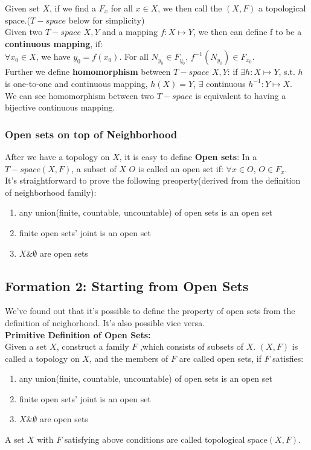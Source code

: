 \documentclass[a4paper, 12pt]{article}
\begin{document}
\newpage

\indent Given set $X$, if we find a $F_x$ for all $x \in X$, we then call the $(X, F)$ a topological space.($T-space$ below for simplicity)\\
\indent Given two $T-space$ $X,Y$ and a mapping $f: X \mapsto Y$, we then can define f to be a \textbf{continuous mapping}, if:\\
$\forall x_0 \in X$, we have $y_0 = f(x_0)$. For all $N_{y_0} \in F_{y_0}$, $f^{-1}(N_{y_0}) \in F_{x_0}$.\\
\indent Further we define \textbf{homomorphism} between $T-space$ $X,Y$:
if $\exists h: X \mapsto Y$, s.t. $h$ is one-to-one and continuous mapping, $h(X)=Y$, $\exists$ continuous $h^{-1}: Y \mapsto X$.\\
\indent We can see homomorphism between two $T-space$ is equivalent to having a bijective continuous mapping. 
\subsubsection{Open sets on top of Neighborhood}
After we have a topology on $X$, it is easy to define \textbf{Open sets}:
In a $T-space (X, F)$, a subset of $X$ $O$ is called an open set if: $\forall x \in O$, $O \in F_x$.\\
\indent It's straightforward to prove the following preoperty(derived from the definition of neighborhood family):
\begin{enumerate}
	\item any union(finite, countable, uncountable) of open sets is an open set
	\item finite open sets' joint is an open set
	\item $X \& \emptyset$ are open sets
\end{enumerate}

\subsection{Formation 2: Starting from Open Sets}
We've found out that it's possible to define the property of open sets from the definition of neighorhood. It's also possible vice versa.\\
\textbf{Primitive Definition of Open Sets: }\\
\indent Given a set $X$, construct a family $F$ ,which consists of subsets of $X$. $(X, F)$ is called a topology on $X$, and the members of $F$ are called open sets, if $F$ satisfies:
\begin{enumerate}
	\item any union(finite, countable, uncountable) of open sets is an open set
	\item finite open sets' joint is an open set
	\item $X \& \emptyset$ are open sets	
\end{enumerate}
A set $X$ with $F$ satisfying above conditions are called topological space$(X, F)$.\\
\end{document}
